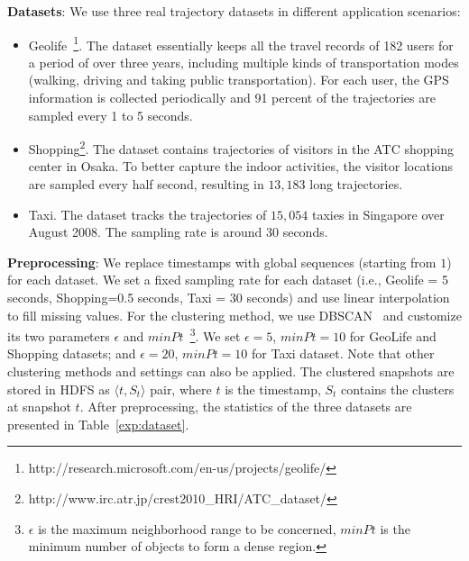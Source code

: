 \textbf{Datasets}: We use three real trajectory datasets in different application scenarios:
\begin{itemize}
\item{Geolife}~\footnote{http://research.microsoft.com/en-us/projects/geolife/}. The dataset essentially keeps all the travel records of 182 users for a period
of over three years, including multiple kinds of transportation modes (walking, driving and taking public
transportation). For each user, the GPS information is collected periodically and 91 percent of the trajectories
are sampled every 1 to 5 seconds.
\item{Shopping}\footnote{http://www.irc.atr.jp/crest2010\_HRI/ATC\_dataset/}. The dataset contains
  trajectories of visitors in the ATC shopping center in Osaka. To better capture the indoor activities, the visitor locations are sampled every half second, resulting in $13,183$ long trajectories. 
\item{Taxi}. The dataset tracks the trajectories of $15,054$ taxies in Singapore over August 2008. The sampling
rate is around 30 seconds. 
\end{itemize}


\textbf{Preprocessing}: We replace timestamps with global sequences (starting from $1$) for each dataset. 
We set a fixed sampling rate for each dataset (i.e., Geolife = 5 seconds, Shopping=0.5 seconds, Taxi = 30 seconds)
and use linear interpolation to fill missing values.
For the clustering method, we use DBSCAN~\cite{ester1996density} and customize its two parameters $\epsilon$ and $minPt$~\footnote{$\epsilon$ is the maximum neighborhood range to be concerned, $minPt$ is the minimum number of objects to form a dense region.}. We set $\epsilon=5$, $minPt=10$ for GeoLife and Shopping datasets; and $\epsilon=20$, $minPt=10$ for Taxi dataset. Note that other clustering methods and settings can also be applied. The clustered snapshots are stored in HDFS as $\langle t, S_t \rangle$ pair, where $t$ is the timestamp, $S_t$ contains the clusters at snapshot $t$. 
After preprocessing, the statistics of the three datasets are presented in Table~\ref{exp:dataset}. 

